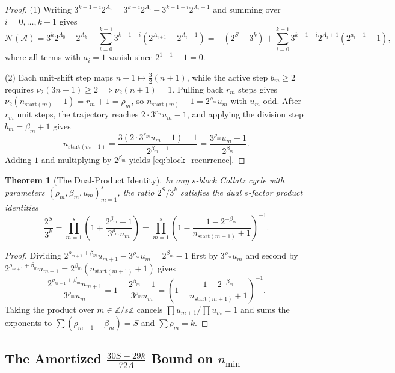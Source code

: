 \documentclass[11pt, a4paper]{amsart}
\newtheorem{theorem}{Theorem}[section]
\theoremstyle{definition}
\newcommand{\Z}{\mathbb{Z}}
\newcommand{\N}{\mathcal{N}}
\newcommand{\A}{\mathcal{A}}
\begin{document}
\begin{proof}
(1) Writing $3^{k-1-i} 2^{A_i} = 3^{k-i} 2^{A_i} - 3^{k-1-i} 2^{A_i + 1}$ and summing over $i = 0, \dots, k-1$ gives
\[
\N(\A) = 3^k 2^{A_0} - 2^{A_k} + \sum_{i=0}^{k-1} 3^{k-1-i}\left(2^{A_{i+1}} - 2^{A_i + 1}\right) = -(2^S - 3^k) + \sum_{i=0}^{k-1} 3^{k-1-i} 2^{A_i + 1}\left(2^{a_i - 1} - 1\right),
\]
where all terms with $a_i = 1$ vanish since $2^{1-1} - 1 = 0$.

(2) Each unit-shift step maps $n + 1 \mapsto \frac{3}{2}(n + 1)$, while the active step $b_m \ge 2$ requires $\nu_2(3n + 1) \ge 2 \implies \nu_2(n + 1) = 1$. Pulling back $r_m$ steps gives $\nu_2(n_{\text{start}(m)} + 1) = r_m + 1 = \rho_m$, so $n_{\text{start}(m)} + 1 = 2^{\rho_m} u_m$ with $u_m$ odd. After $r_m$ unit steps, the trajectory reaches $2 \cdot 3^{r_m} u_m - 1$, and applying the division step $b_m = \beta_m + 1$ gives
\[
n_{\text{start}(m+1)} = \frac{3(2 \cdot 3^{r_m} u_m - 1) + 1}{2^{\beta_m + 1}} = \frac{3^{\rho_m} u_m - 1}{2^{\beta_m}}.
\]
Adding $1$ and multiplying by $2^{\beta_m}$ yields \eqref{eq:block_recurrence}.
\end{proof}

\begin{theorem}[The Dual-Product Identity]\label{thm:dual_product}
In any $s$-block Collatz cycle with parameters $(\rho_m, \beta_m, u_m)_{m=1}^s$, the ratio $2^S / 3^k$ satisfies the dual $s$-factor product identities
\begin{equation}\label{eq:dual_product}
\frac{2^S}{3^k} = \prod_{m=1}^s \left( 1 + \frac{2^{\beta_m} - 1}{3^{\rho_m} u_m} \right) = \prod_{m=1}^s \left( 1 - \frac{1 - 2^{-\beta_m}}{n_{\text{start}(m+1)} + 1} \right)^{-1}.
\end{equation}
\end{theorem}

\begin{proof}
Dividing $2^{\rho_{m+1} + \beta_m} u_{m+1} - 3^{\rho_m} u_m = 2^{\beta_m} - 1$ first by $3^{\rho_m} u_m$ and second by $2^{\rho_{m+1} + \beta_m} u_{m+1} = 2^{\beta_m}(n_{\text{start}(m+1)} + 1)$ gives
\[
\frac{2^{\rho_{m+1} + \beta_m} u_{m+1}}{3^{\rho_m} u_m} = 1 + \frac{2^{\beta_m} - 1}{3^{\rho_m} u_m} = \left(1 - \frac{1 - 2^{-\beta_m}}{n_{\text{start}(m+1)} + 1}\right)^{-1}.
\]
Taking the product over $m \in \Z/s\Z$ cancels $\prod u_{m+1} / \prod u_m = 1$ and sums the exponents to $\sum (\rho_{m+1} + \beta_m) = S$ and $\sum \rho_m = k$.
\end{proof}

\subsection{The Amortized $\frac{30S - 29k}{72\Lambda}$ Bound on $n_{\min}$}
\end{document}
